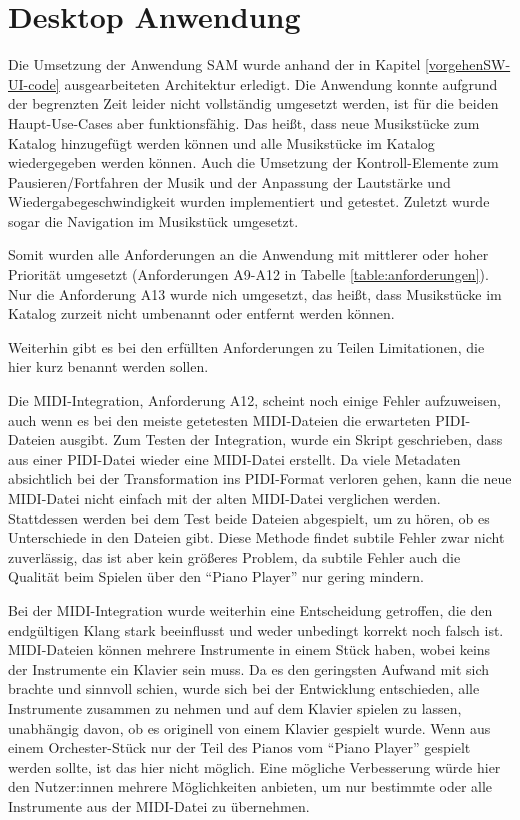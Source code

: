 \section{Desktop Anwendung} \label{umsetzungSW-UI}

Die Umsetzung der Anwendung \ac{SAM} wurde anhand der in Kapitel \ref{vorgehenSW-UI-code} ausgearbeiteten Architektur erledigt.
Die Anwendung konnte aufgrund der begrenzten Zeit leider nicht vollständig umgesetzt werden, ist für die beiden Haupt-Use-Cases aber funktionsfähig. \newline
Das heißt, dass neue Musikstücke zum Katalog hinzugefügt werden können und alle Musikstücke im Katalog wiedergegeben werden können.
Auch die Umsetzung der Kontroll-Elemente zum Pausieren/Fortfahren der Musik und der Anpassung der Lautstärke und Wiedergabegeschwindigkeit wurden implementiert und getestet.
Zuletzt wurde sogar die Navigation im Musikstück umgesetzt.

Somit wurden alle Anforderungen an die Anwendung mit mittlerer oder hoher Priorität umgesetzt (Anforderungen A9-A12 in Tabelle \ref{table:anforderungen}).
Nur die Anforderung A13 wurde nich umgesetzt, das heißt, dass Musikstücke im Katalog zurzeit nicht umbenannt oder entfernt werden können.

Weiterhin gibt es bei den erfüllten Anforderungen zu Teilen Limitationen, die hier kurz benannt werden sollen.

Die \ac{MIDI}-Integration, Anforderung A12, scheint noch einige Fehler aufzuweisen, auch wenn es bei den meiste getetesten \ac{MIDI}-Dateien die erwarteten \ac{PIDI}-Dateien ausgibt.
Zum Testen der Integration, wurde ein Skript geschrieben, dass aus einer \ac{PIDI}-Datei wieder eine \ac{MIDI}-Datei erstellt.
Da viele Metadaten absichtlich bei der Transformation ins \ac{PIDI}-Format verloren gehen, kann die neue \ac{MIDI}-Datei nicht einfach mit der alten \ac{MIDI}-Datei verglichen werden.
Stattdessen werden bei dem Test beide Dateien abgespielt, um zu hören, ob es Unterschiede in den Dateien gibt.
Diese Methode findet subtile Fehler zwar nicht zuverlässig, das ist aber kein größeres Problem, da subtile Fehler auch die Qualität beim Spielen über den \enquote{Piano Player} nur gering mindern.

Bei der \ac{MIDI}-Integration wurde weiterhin eine Entscheidung getroffen, die den endgültigen Klang stark beeinflusst und weder unbedingt korrekt noch falsch ist. \newline
\ac{MIDI}-Dateien können mehrere Instrumente in einem Stück haben, wobei keins der Instrumente ein Klavier sein muss. \newline
Da es den geringsten Aufwand mit sich brachte und sinnvoll schien, wurde sich bei der Entwicklung entschieden, alle Instrumente zusammen zu nehmen und auf dem Klavier spielen zu lassen, unabhängig davon, ob es originell von einem Klavier gespielt wurde.
Wenn aus einem Orchester-Stück nur der Teil des Pianos vom \enquote{Piano Player} gespielt werden sollte, ist das hier nicht möglich. \newline
Eine mögliche Verbesserung würde hier den Nutzer:innen mehrere Möglichkeiten anbieten, um nur bestimmte oder alle Instrumente aus der \ac{MIDI}-Datei zu übernehmen.

